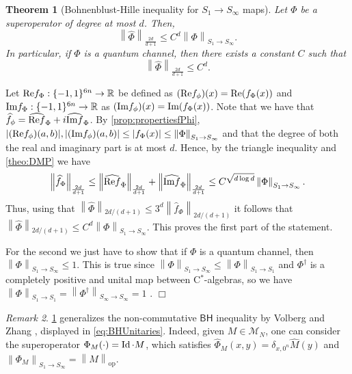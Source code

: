 \documentclass[11pt]{article}
\newcommand{\norm}[1]{\left\|{#1}\right\|}
\newcommand{\BH}{\textsf{BH}}
\theoremstyle{plain}
\newtheorem{theorem}{Theorem}
\renewcommand{\Re}{\mbox{\rm Re}}
\renewcommand{\Im}{\mbox{\rm Im}}
\DeclareMathOperator{\op}{op}
\newcommand{\Id}{\ensuremath{\mathop{\rm Id}\nolimits}}
\theoremstyle{plain}
\theoremstyle{definition}
\theoremstyle{remark}
\newtheorem{remark}[theorem]{Remark}
\renewenvironment{proof}[1][]{
    \begin{trivlist}
    \item[\hspace{\labelsep}{\em\noindent Proof#1:\/}]}
    {{\hfill$\Box$}
    \end{trivlist}
}
\theoremstyle{named}
\begin{document}
\begin{theorem}[Bohnenblust-Hille inequality for $S_1\to S_\infty$ maps]\label{theo:BHchannels}
    Let $\Phi$ be a superoperator of degree at most $d$. Then, $$\norm{\widehat\Phi}_{\frac{2d}{d+1}}\leq C^{d}\norm{\Phi}_{S_1\to S_\infty}.$$ In particular, if $\Phi$ is a quantum channel, then there exists a constant $C$ such that
    $$
    \norm{\widehat\Phi}_{\frac{2d}{d+1}}\leq C^{d}.
    $$
\end{theorem}
\begin{proof}
    Let $\Re f_\Phi:\{-1,1\}^{6n}\to \mathbb R$ be defined as $(\Re f_\phi) (x)=\Re (f_\Phi (x))$ and $\Im f_\Phi:\{-1,1\}^{6n}\to \mathbb R$ as $(\Im f_\phi) (x)=\Im (f_\Phi (x))$. Note that we have that $\widehat f_{\phi}=\widehat{\Re f}_{\Phi}+i\widehat{\Im f}_{\Phi}$. By \cref{prop:propertiesfPhi}, $|(\Re f_\phi) (a,b)|,|(\Im f_\phi) (a,b)|\leq| f_\Phi (x)|\leq \norm{\Phi}_{S_1\to S_\infty}$ and that the degree of both the real and imaginary part is at most $d$. Hence, by the triangle inequality and \cref{theo:DMP} we have $$ \norm{\widehat f_{\Phi}}_{\frac{2d}{d+1}}\leq  \norm{\widehat {\Re f}_{\Phi}}_{\frac{2d}{d+1}}+ \norm{\widehat{ \Im f}_{\Phi}}_{\frac{2d}{d+1}}\leq C^{\sqrt{d\log d}}\norm{\Phi}_{S_1\to S_\infty}.$$
    Thus, using that $\norm{\widehat\Phi}_{2d/(d+1)}\leq 3^d\norm{\widehat f_{\Phi}}_{2d/(d+1)}$ it follows that $\norm{\widehat\Phi}_{2d/(d+1)}\leq C^d\norm{\Phi}_{S_1\to S_\infty}$.
    This proves the first part of the statement. 
    
    For the second we just have to show that if $\Phi$ is a quantum channel, then $\norm{\Phi}_{S_1\to S_\infty}\leq 1$. This is true since $\norm{\Phi}_{S_1\to S_\infty}\leq \norm{\Phi}_{S_1\to S_1}$ and $\Phi^\dag$ is a completely positive and unital map between C$^*$-algebras, so we have $\norm{\Phi}_{S_1\to S_1}=\norm{\Phi^\dag}_{S_\infty\to S_\infty}=1$ \cite[Proposition 3.2]{paulsenoperatoralgebras}.
    \end{proof}
\begin{remark}\label{rem:channelsimpliesunitaries}
    \cref{theo:BHchannels} generalizes the non-commutative $\BH$ inequality by Volberg and Zhang \cite{volberg2023noncommutative}, displayed in \cref{eq:BHUnitaries}. Indeed, given $M\in\mathcal{M}_N$, one can consider the superoperator $\Phi_M(\cdot)=\Id\cdot M$, which satisfies $\widehat\Phi_M(x,y)=\delta_{x,0^n}\widehat M(y)$ and $\norm{\Phi_M}_{S_1\to S_\infty}=\norm{M}_{\op}.$
\end{remark}
\end{document}
